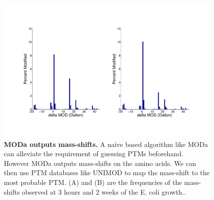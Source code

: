 \documentclass[12pt]{article}
\begin{document}
\clearpage
\begin{figure}[!ht]
\centerline{\includegraphics[width=8in]{Figures/PTMdalton.pdf}}
\caption{\label{fig:PTMinDalton}\textbf{MODa outputs mass-shifts.} A naïve based algorithm like MODa can alleviate the requirement of guessing PTMs beforehand. However MODa outputs mass-shifts on the amino acids. We can then use PTM databases like UNIMOD to map the mass-shift to the most probable PTM. (A) and (B) are the frequencies of the mass-shifts observed  at 3 hours and 2 weeks of the E. coli growth..}
\end{figure}
\end{document}
